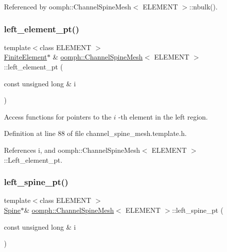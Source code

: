 Referenced by oomph\+::\+Channel\+Spine\+Mesh$<$ E\+L\+E\+M\+E\+N\+T $>$\+::nbulk().

\mbox{\label{classoomph_1_1ChannelSpineMesh_a84cbf50caead0aba0170246f4ce7330f}} 
\subsubsection{\texorpdfstring{left\+\_\+element\+\_\+pt()}{left\_element\_pt()}}
{\footnotesize\ttfamily template$<$class E\+L\+E\+M\+E\+NT $>$ \\
\hyperlink{classoomph_1_1FiniteElement}{Finite\+Element}$\ast$ \& \hyperlink{classoomph_1_1ChannelSpineMesh}{oomph\+::\+Channel\+Spine\+Mesh}$<$ E\+L\+E\+M\+E\+NT $>$\+::left\+\_\+element\+\_\+pt (\begin{DoxyParamCaption}\item[{const unsigned long \&}]{i }\end{DoxyParamCaption})\hspace{0.3cm}{\ttfamily [inline]}}



Access functions for pointers to the $ i $ -\/th element in the left region. 



Definition at line 88 of file channel\+\_\+spine\+\_\+mesh.\+template.\+h.



References i, and oomph\+::\+Channel\+Spine\+Mesh$<$ E\+L\+E\+M\+E\+N\+T $>$\+::\+Left\+\_\+element\+\_\+pt.

\mbox{\label{classoomph_1_1ChannelSpineMesh_ad4ae203f8a69fa3c8f0541ede45d7630}} 
\subsubsection{\texorpdfstring{left\+\_\+spine\+\_\+pt()}{left\_spine\_pt()}}
{\footnotesize\ttfamily template$<$class E\+L\+E\+M\+E\+NT $>$ \\
\hyperlink{classoomph_1_1Spine}{Spine}$\ast$\& \hyperlink{classoomph_1_1ChannelSpineMesh}{oomph\+::\+Channel\+Spine\+Mesh}$<$ E\+L\+E\+M\+E\+NT $>$\+::left\+\_\+spine\+\_\+pt (\begin{DoxyParamCaption}\item[{const unsigned long \&}]{i }\end{DoxyParamCaption})\hspace{0.3cm}{\ttfamily [inline]}}



